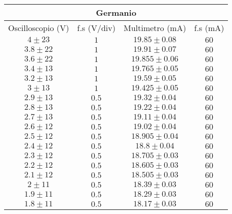 \documentclass[../main.tex]{subfiles}
\begin{document}
    \begin{tabular}{ ||c|c|c|c|| }
        \hline
        \multicolumn{4}{||c||}{Germanio} \\
        \hline
        Oscilloscopio (V) & f.s (V/div) & Multimetro (mA)   & f.s (mA) \\
        \hline
        $4\pm 23$         & $1$         & $19.85\pm 0.08$   & $60$     \\
        \hline
        $3.8\pm 22$       & $1$         & $19.91\pm 0.07$   & $60$     \\
        \hline
        $3.6\pm 22$       & $1$         & $19.855\pm 0.06$  & $60$     \\
        \hline
        $3.4\pm 13$       & $1$         & $19.765\pm 0.05$  & $60$     \\
        \hline
        $3.2\pm 13$       & $1$         & $19.59\pm 0.05$   & $60$     \\
        \hline
        $3\pm 13$         & $1$         & $19.425\pm 0.05$  & $60$     \\
        \hline
        $2.9\pm 13$       & $0.5$       & $19.32\pm 0.04$   & $60$     \\
        \hline
        $2.8\pm 13$       & $0.5$       & $19.22\pm 0.04$   & $60$     \\
        \hline
        $2.7\pm 13$       & $0.5$       & $19.11\pm 0.04$   & $60$     \\
        \hline
        $2.6\pm 12$       & $0.5$       & $19.02\pm 0.04$   & $60$     \\
        \hline
        $2.5\pm 12$       & $0.5$       & $18.905\pm 0.04$  & $60$     \\
        \hline
        $2.4\pm 12$       & $0.5$       & $18.8\pm 0.04$    & $60$     \\
        \hline
        $2.3\pm 12$       & $0.5$       & $18.705\pm 0.03$  & $60$     \\
        \hline
        $2.2\pm 12$       & $0.5$       & $18.605\pm 0.03$  & $60$     \\
        \hline
        $2.1\pm 12$       & $0.5$       & $18.505\pm 0.03$  & $60$     \\
        \hline
        $2\pm 11$         & $0.5$       & $18.39\pm 0.03$   & $60$     \\
        \hline
        $1.9\pm 11$       & $0.5$       & $18.29\pm 0.03$   & $60$     \\
        \hline
        $1.8\pm 11$       & $0.5$       & $18.17\pm 0.03$   & $60$     \\

\end{tabular}
\end{document}
